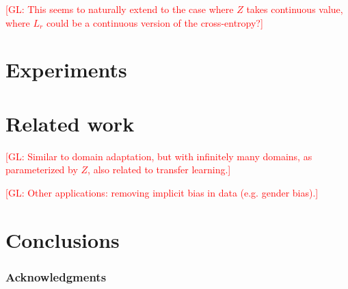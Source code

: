 \documentclass{article}
\newcommand{\glnote}[1]{\textcolor{red}{[GL: #1]}}
\theoremstyle{plain}
\begin{document}
\glnote{This seems to naturally extend to the case where $Z$ takes continuous
value, where $L_r$ could be a continuous version of the cross-entropy?}

\section{Experiments}

\section{Related work}

\glnote{Similar to domain adaptation, but with infinitely many domains,
as parameterized by $Z$, also related to transfer learning.}

\glnote{Other applications: removing implicit bias in data (e.g. gender bias).}

\section{Conclusions}

\subsubsection*{Acknowledgments}


{\small
}
\end{document}
